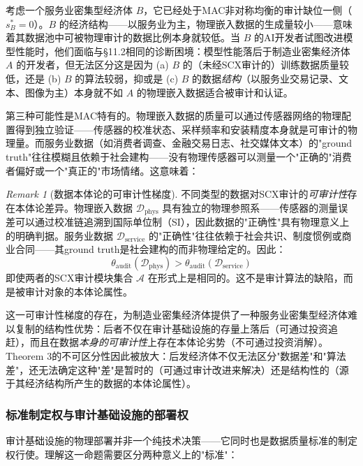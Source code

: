 \documentclass[12pt,a4paper]{ctexart}
\theoremstyle{definition}
\theoremstyle{remark}
\newtheorem{remark}{Remark}[section]
\begin{document}
考虑一个服务业密集型经济体 $B$，它已经处于MAC非对称均衡的审计缺位一侧（$s_B^* = 0$）。$B$ 的经济结构——以服务业为主，物理嵌入数据的生成量较小——意味着其数据池中可被物理审计的数据比例本身就较低。当 $B$ 的AI开发者试图改进模型性能时，他们面临与§11.2相同的诊断困境：模型性能落后于制造业密集经济体 $A$ 的开发者，但无法区分这是因为 (a) $B$ 的（未经SCX审计的）训练数据质量较低，还是 (b) $B$ 的算法较弱，抑或是 (c) $B$ 的数据\textit{结构}（以服务业交易记录、文本、图像为主）本身就不如 $A$ 的物理嵌入数据适合被审计和认证。

第三种可能性是MAC特有的。物理嵌入数据的质量可以通过传感器网络的物理配置得到独立验证——传感器的校准状态、采样频率和安装精度本身就是可审计的物理量。而服务业数据（如消费者调查、金融交易日志、社交媒体文本）的"ground truth"往往模糊且依赖于社会建构——没有物理传感器可以测量一个"正确的"消费者偏好或一个"真正的"市场情绪。这意味着：

\begin{remark}[数据本体论的可审计性梯度]
不同类型的数据对SCX审计的\textit{可审计性}存在本体论差异。物理嵌入数据 $\mathcal{D}_{\text{phys}}$ 具有独立的物理参照系——传感器的测量误差可以通过校准链追溯到国际单位制（SI），因此数据的"正确性"具有物理意义上的明确判据。服务业数据 $\mathcal{D}_{\text{service}}$ 的"正确性"往往依赖于社会共识、制度惯例或商业合同——其ground truth是社会建构的而非物理给定的。因此：
\begin{equation}
\theta_{\text{audit}}(\mathcal{D}_{\text{phys}}) > \theta_{\text{audit}}(\mathcal{D}_{\text{service}})
\end{equation}
即使两者的SCX审计模块集合 $\mathcal{A}$ 在形式上是相同的。这不是审计算法的缺陷，而是被审计对象的本体论属性。
\end{remark}

这一可审计性梯度的存在，为制造业密集经济体提供了一种服务业密集型经济体难以复制的结构性优势：后者不仅在审计基础设施的存量上落后（可通过投资追赶），而且在数据\textit{本身的可审计性}上存在本体论劣势（不可通过投资消解）。Theorem 3的不可区分性因此被放大：后发经济体不仅无法区分"数据差"和"算法差"，还无法确定这种"差"是暂时的（可通过审计改进来解决）还是结构性的（源于其经济结构所产生的数据的本体论属性）。

\subsubsection*{标准制定权与审计基础设施的部署权}

审计基础设施的物理部署并非一个纯技术决策——它同时也是数据质量标准的制定权行使。理解这一命题需要区分两种意义上的"标准"：
\end{document}
